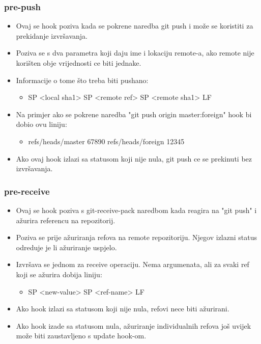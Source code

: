 \documentclass{beamer}
\begin{document}
\begin{frame}
\frametitle{pre-push}
\begin{itemize}
    \item Ovaj se hook poziva kada se pokrene naredba git push i može se koristiti za prekidanje izvršavanja.
    \item Poziva se s dva parametra koji daju ime i lokaciju remote-a, ako remote nije korišten obje vrijednosti ce biti jednake. 
    \item Informacije o tome što treba biti pushano:
    \begin{itemize}
        \item <local ref> SP <local sha1> SP <remote ref> SP <remote sha1> LF
    \end{itemize}
    \item Na primjer ako se pokrene naredba "git push origin master:foreign" hook bi dobio ovu liniju:
    \begin{itemize}
        \item refs/heads/master 67890 refs/heads/foreign 12345
    \end{itemize} 
    \item Ako ovaj hook izlazi sa statusom koji nije nula, git push ce se prekinuti bez izvršavanja.
\end{itemize}
\end{frame}

\begin{frame}
\frametitle{pre-receive}
\begin{itemize}
    \item Ovaj se hook poziva s git-receive-pack naredbom kada reagira na "git push" i ažurira referencu na repozitorij.
    \item Poziva se prije ažuriranja refova na remote repozitoriju. Njegov izlazni status odreduje je li ažuriranje uspjelo.
    \item Izvršava se jednom za receive operaciju. Nema argumenata, ali za svaki ref koji se ažurira dobija liniju:
    \begin{itemize}
        \item <old-value> SP <new-value> SP <ref-name> LF
    \end{itemize}
    \item Ako hook izlazi sa statusom koji nije nula, refovi nece biti ažurirani.
    \item Ako hook izade sa statusom nula, ažuriranje individualnih refova još uvijek može biti zaustavljeno s update hook-om.
\end{itemize}
\end{frame}
\end{document}

